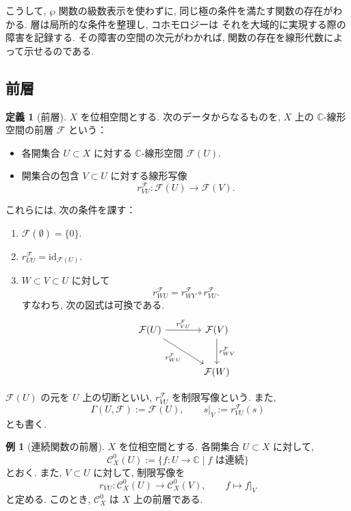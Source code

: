 \documentclass[dvipdfmx,a4paper,11pt]{article} %
\newcommand{\C}{\mathbb{C}}
\theoremstyle{definition}
\numberwithin{equation}{section}
\newtheorem{dfn}[thm]{定義}
\newtheorem{exa}[thm]{例}
\begin{document}
こうして, $\wp$ 関数の級数表示を使わずに, 
同じ極の条件を満たす関数の存在がわかる.
層は局所的な条件を整理し, コホモロジーは
それを大域的に実現する際の障害を記録する.
その障害の空間の次元がわかれば, 
関数の存在を線形代数によって示せるのである.


\subsection{前層}\label{O-S033}

\begin{dfn}[前層]\label{O-M177}
$X$ を位相空間とする.
次のデータからなるものを, 
$X$ 上の $\C$-線形空間の前層 $\mathcal F$ という：
\begin{itemize}
\item 各開集合 $U\subset X$ に対する $\C$-線形空間 $\mathcal F(U)$.
\item 開集合の包含 $V\subset U$ に対する線形写像
\[
r^{\mathcal F}_{VU}:\mathcal F(U)\longrightarrow\mathcal F(V).
\]
\end{itemize}
これらには, 次の条件を課す：
\begin{enumerate}
\item $\mathcal F(\emptyset)=\{0\}$.
\item $r^{\mathcal F}_{UU}=\mathrm{id}_{\mathcal F(U)}$.
\item $W\subset V\subset U$ に対して
\[
r^{\mathcal F}_{WU}
=r^{\mathcal F}_{WV}\circ r^{\mathcal F}_{VU}.
\]
すなわち, 次の図式は可換である.
\[
\begin{tikzcd}[column sep=large,row sep=large]
\mathcal F(U)\arrow[r,"r^{\mathcal F}_{VU}"]\arrow[dr,"r^{\mathcal F}_{WU}"']
&\mathcal F(V)\arrow[d,"r^{\mathcal F}_{WV}"]\\
&\mathcal F(W)
\end{tikzcd}
\]

\end{enumerate}

$\mathcal F(U)$ の元を $U$ 上の切断といい, 
$r^{\mathcal F}_{VU}$ を制限写像という.
また, 
\[
\Gamma(U,\mathcal F):=\mathcal F(U),\qquad
s|_V:=r^{\mathcal F}_{VU}(s)
\]
とも書く.
\end{dfn}

\begin{exa}[連続関数の前層]\label{exa-continuous-presheaf}
$X$ を位相空間とする.
各開集合 $U\subset X$ に対して, 
\[
\mathcal C_X^0(U)
:=\{f:U\to\C\mid f\text{ は連続}\}
\]
とおく.
また, $V\subset U$ に対して, 制限写像を
\[
r_{VU}:\mathcal C_X^0(U)\longrightarrow\mathcal C_X^0(V),
\qquad f\longmapsto f|_V
\]
と定める.
このとき, $\mathcal C_X^0$ は $X$ 上の前層である.
\end{exa}
\end{document}
